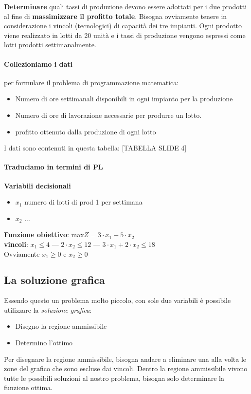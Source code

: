 \documentclass[12pt, a4paper, openany]{book}
\begin{document}
\textbf{Determinare} quali tassi di produzione devono essere adottati per i due prodotti al fine di \textbf{massimizzare il profitto totale}.
Bisogna ovviamente tenere in considerazione i vincoli (tecnologici) di capacità dei tre impianti.
Ogni prodotto viene realizzato in lotti da 20 unità e i tassi di produzione vengono espressi come lotti prodotti settimanalmente.

\paragraph*{Collezioniamo i dati} per formulare il problema di programmazione matematica:
\begin{itemize}
    \item Numero di ore settimanali disponibili in ogni impianto per la produzione
    \item Numero di ore di lavorazione necessarie per produrre un lotto.
    \item profitto ottenuto dalla produzione di ogni lotto
\end{itemize}
I dati sono contenuti in questa tabella: [TABELLA SLIDE 4]

\paragraph*{Traduciamo in termini di PL}
\textbf{Variabili decisionali}
\begin{itemize}
    \item $x_1$ numero di lotti di prod 1 per settimana
    \item $x_2$ ...
\end{itemize}
\textbf{Funzione obiettivo}: max$Z = 3 \cdot x_1 + 5 \cdot x_2$
\\\textbf{vincoli}: $x_1\leq 4$ --- $2 \cdot x_2 \leq 12$ --- $3\cdot x_1 + 2\cdot x_2 \leq 18$
\\Ovviamente $x_1 \geq 0$ e $x_2 \geq 0$

\subsection*{La soluzione grafica} Essendo questo un problema molto piccolo, con sole due variabili è possibile
utilizzare la \emph{soluzione grafica}:
\begin{itemize}
    \item Disegno la regione ammissibile
    \item Determino l'ottimo
\end{itemize} 
Per disegnare la regione ammissibile, bisogna andare a eliminare una alla volta le zone del grafico che sono escluse dai vincoli.
Dentro la regione ammissibile vivono tutte le possibili soluzioni al nostro problema, bisogna solo determinare la funzione ottima.
\end{document}
